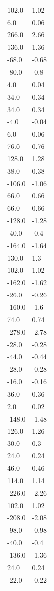 \begin{longtable}{ll}
102.0 & 1.02 \\
6.0 & 0.06 \\
266.0 & 2.66 \\
136.0 & 1.36 \\
-68.0 & -0.68 \\
-80.0 & -0.8 \\
4.0 & 0.04 \\
34.0 & 0.34 \\
34.0 & 0.34 \\
-4.0 & -0.04 \\
6.0 & 0.06 \\
76.0 & 0.76 \\
128.0 & 1.28 \\
38.0 & 0.38 \\
-106.0 & -1.06 \\
66.0 & 0.66 \\
66.0 & 0.66 \\
-128.0 & -1.28 \\
-40.0 & -0.4 \\
-164.0 & -1.64 \\
130.0 & 1.3 \\
102.0 & 1.02 \\
-162.0 & -1.62 \\
-26.0 & -0.26 \\
-160.0 & -1.6 \\
74.0 & 0.74 \\
-278.0 & -2.78 \\
-28.0 & -0.28 \\
-44.0 & -0.44 \\
-28.0 & -0.28 \\
-16.0 & -0.16 \\
36.0 & 0.36 \\
2.0 & 0.02 \\
-148.0 & -1.48 \\
126.0 & 1.26 \\
30.0 & 0.3 \\
24.0 & 0.24 \\
46.0 & 0.46 \\
114.0 & 1.14 \\
-226.0 & -2.26 \\
102.0 & 1.02 \\
-208.0 & -2.08 \\
-98.0 & -0.98 \\
-40.0 & -0.4 \\
-136.0 & -1.36 \\
24.0 & 0.24 \\
-22.0 & -0.22 \\

\end{longtable}
